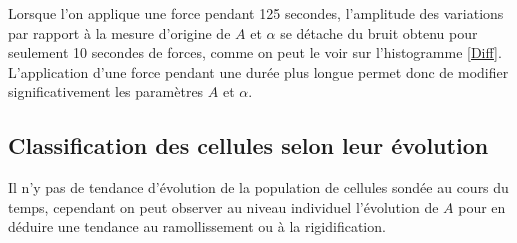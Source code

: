 Lorsque l'on applique une force pendant 125 secondes, l'amplitude des variations par rapport à la mesure d'origine de $A$ et $\alpha$ se détache du bruit obtenu pour seulement 10 secondes de forces, comme on peut le voir sur l'histogramme \ref{Diff}. L'application d'une force pendant une durée plus longue permet donc de modifier significativement les paramètres $A$ et $\alpha$. 

\subsection{Classification des cellules selon leur évolution}

Il n'y pas de tendance d'évolution de la population de cellules sondée au cours du temps, cependant on peut observer au niveau individuel l'évolution de $A$ pour en déduire une tendance au ramollissement ou à la rigidification. 

